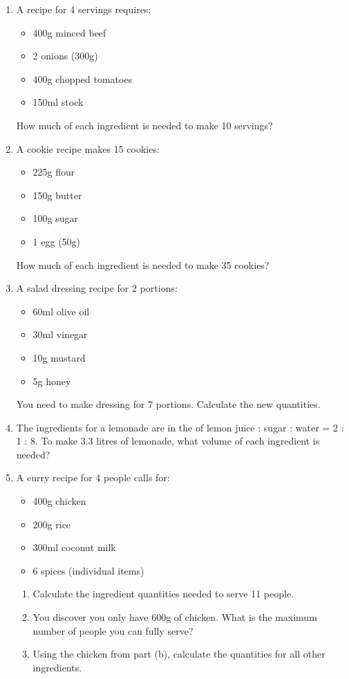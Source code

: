 \documentclass[12pt,a4paper]{article}
\newcommand{\ealtext}[1]{\foreignlanguage{polish}{#1}}
\newlength{\ealglosswd}
\newlength{\ealglossraise}
\newcommand{\ealkey}[1]{\textcolor{ealkeycolour}{#1}}
\newcommand{\ealgloss}[2]{%
  \sbox{\ealboxen}{\ealkey{#1}}%
  \sbox{\ealboxtr}{\small\textcolor{ealtwocolour}{\ealtext{#2}}}%
  \setlength{\ealglosswd}{\wd\ealboxen}%
  \ifdim\wd\ealboxtr>\ealglosswd\setlength{\ealglosswd}{\wd\ealboxtr}\fi
  \leavevmode
  \makebox[\ealglosswd][c]{%
    \makebox[0pt][c]{\usebox{\ealboxen}}%
    \makebox[0pt][c]{\raisebox{\ealglossraise}{\usebox{\ealboxtr}}}%
  }%
}
\newenvironment{ealglossed}{\par\linespread{2.1}\selectfont\ignorespaces}{\par}
\begin{document}
\begin{enumerate}
\item A recipe for 4 servings requires:
    \begin{itemize}
    \item 400g minced beef
    \item 2 onions (300g)
    \item 400g chopped tomatoes
    \item 150ml stock
    \end{itemize}
    How much of each ingredient is needed to make 10 servings?

\item A cookie recipe makes 15 cookies:
    \begin{itemize}
    \item 225g flour
    \item 150g butter
    \item 100g sugar
    \item 1 egg (50g)
    \end{itemize}
    How much of each ingredient is needed to make 35 cookies?

\item A salad dressing recipe for 2 portions:
    \begin{itemize}
    \item 60ml olive oil
    \item 30ml vinegar
    \item 10g mustard
    \item 5g honey
    \end{itemize}
    You need to make dressing for 7 portions. Calculate the new quantities.

\item \begin{ealglossed} The ingredients for a lemonade are in the \ealgloss{ratio}{stosunek} of \newline lemon juice : sugar : water = 2 : 1 : 8. To make 3.3 litres of lemonade, what volume of each ingredient is needed? \end{ealglossed}

\item A curry recipe for 4 people calls for:
    \begin{itemize}
    \item 400g chicken
    \item 200g rice
    \item 300ml coconut milk
    \item 6 spices (individual items)
    \end{itemize}
    \begin{enumerate}
    \item Calculate the ingredient quantities needed to serve 11 people.
    \item You discover you only have 600g of chicken. What is the maximum number of people you can fully serve?
    \item Using the chicken from part (b), calculate the quantities for all other ingredients.
    \end{enumerate}
\end{enumerate}
\end{document}

